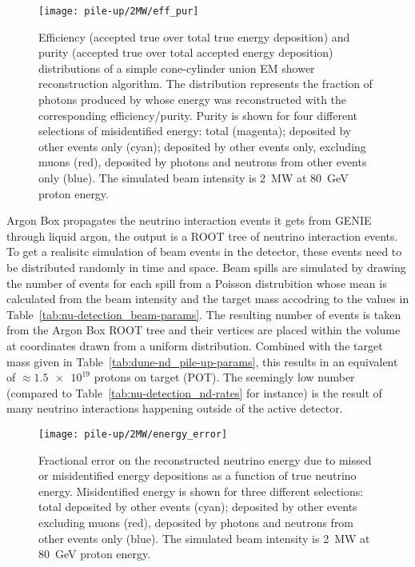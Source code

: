 \begin{figure}[htb]
	\centering
	\texttt{[image: pile-up/2MW/eff\_pur]}
	\caption{Efficiency (accepted true over total true energy deposition) and purity (accepted true over total accepted energy deposition) distributions of a simple cone-cylinder union EM shower reconstruction algorithm.
	The distribution represents the fraction of photons produced by \Pgpz whose energy was reconstructed with the corresponding efficiency/purity.
	Purity is shown for four different selections of misidentified energy: total (magenta); deposited by other events only (cyan); deposited by other events only, excluding muons (red), deposited by photons and neutrons from other events only (blue).
	The simulated beam intensity is \SI{2}{\mega\watt} at \SI{80}{\giga\electronvolt} proton energy.}
	\label{fig:dune-nd_2MW-eff-pur}
\end{figure}

Argon Box propagates the neutrino interaction events it gets from GENIE through liquid argon, the output is a ROOT tree of neutrino interaction events.
To get a realisitc simulation of beam events in the detector, these events need to be distributed randomly in time and space.
Beam spills are simulated by drawing the number of events for each spill from a Poisson distrubition whose mean is calculated from the beam intensity and the target mass accodring to the values in Table~\ref{tab:nu-detection_beam-params}.
The resulting number of events is taken from the Argon Box ROOT tree and their vertices are placed within the \lar{} volume at coordinates drawn from a uniform distribution.
Combined with the target mass given in Table~\ref{tab:dune-nd_pile-up-params}, this results in an equivalent of $\approx \num{1.5e19}$ protons on target (POT).
The seemingly low number (compared to Table~\ref{tab:nu-detection_nd-rates} for instance) is the result of many neutrino interactions happening outside of the active detector.

\begin{figure}[htb]
	\centering
	\texttt{[image: pile-up/2MW/energy\_error]}
	\caption{Fractional error on the reconstructed neutrino energy due to missed or misidentified energy depositions as a function of true neutrino energy.
	Misidentified energy is shown for three different selections: total deposited by other events (cyan); deposited by other events excluding muons (red), deposited by photons and neutrons from other events only (blue).
	The simulated beam intensity is \SI{2}{\mega\watt} at \SI{80}{\giga\electronvolt} proton energy.}
	\label{fig:dune-nd_2MW-energy-error}
\end{figure}

